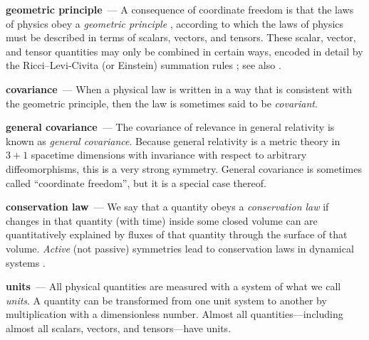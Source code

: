 \documentclass[11pt]{article}
\renewcommand{\paragraph}[1]{\medskip\par\noindent\textbf{#1}~---}
\begin{document}
\paragraph{geometric principle}
A consequence of coordinate freedom is that the laws of physics obey a \emph{geometric principle} \cite{mcp}, according to which the laws of physics must be described in terms of scalars, vectors, and tensors.
These scalar, vector, and tensor quantities may only be combined in certain ways, encoded in detail by the Ricci--Levi-Civita (or Einstein) summation rules \cite{ricci, einstein}; see also \cite{villar2021scalars}.

\paragraph{covariance}
When a physical law is written in a way that is consistent with the geometric principle, then the law is sometimes said to be \emph{covariant}.

\paragraph{general covariance}
The covariance of relevance in general relativity \cite{einstein} is known as \emph{general covariance}.
Because general relativity is a metric theory in $3+1$ spacetime dimensions with invariance with respect to arbitrary diffeomorphisms, this is a very strong symmetry.
General covariance is sometimes called ``coordinate freedom'', but it is a special case thereof.

\paragraph{conservation law}
We say that a quantity obeys a \emph{conservation law} if changes in that quantity (with time) inside some closed volume can are quantitatively explained by fluxes of that quantity through the surface of that volume.
\emph{Active} (not passive) symmetries lead to conservation laws in dynamical systems \cite{noether}.

\paragraph{units}
All physical quantities are measured with a system of what we call \emph{units}.
A quantity can be transformed from one unit system to another by multiplication with a dimensionless number.
Almost all quantities---including almost all scalars, vectors, and tensors---have units.
\end{document}

